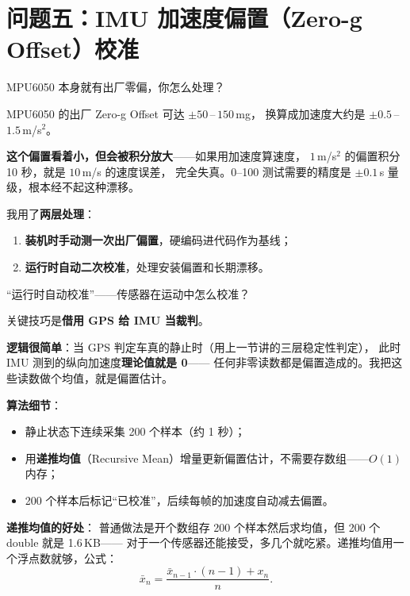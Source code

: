 \documentclass[UTF8,11pt,a4paper]{ctexart}
\begin{document}
\section{问题五：IMU 加速度偏置（Zero-g Offset）校准}

\begin{interviewer}
MPU6050 本身就有出厂零偏，你怎么处理？
\end{interviewer}

\begin{candidate}
MPU6050 的出厂 Zero-g Offset 可达 $\pm 50$\,–\,$150$\,mg，
换算成加速度大约是 $\pm 0.5$\,–\,$1.5$\,m/s$^2$。

\medskip
\textbf{这个偏置看着小，但会被积分放大}——如果用加速度算速度，
$1$\,m/s$^2$ 的偏置积分 10 秒，就是 $10$\,m/s 的速度误差，
完全失真。0--100 测试需要的精度是 $\pm 0.1$\,s 量级，根本经不起这种漂移。

\medskip
我用了\textbf{两层处理}：
\begin{enumerate}[leftmargin=1.4em,topsep=2pt,itemsep=2pt]
  \item \textbf{装机时手动测一次出厂偏置}，硬编码进代码作为基线；
  \item \textbf{运行时自动二次校准}，处理安装偏置和长期漂移。
\end{enumerate}
\end{candidate}

\begin{interviewer}
``运行时自动校准''——传感器在运动中怎么校准？
\end{interviewer}

\begin{candidate}
关键技巧是\textbf{借用 GPS 给 IMU 当裁判}。

\medskip
\textbf{逻辑很简单}：当 GPS 判定车真的静止时（用上一节讲的三层稳定性判定），
此时 IMU 测到的纵向加速度\textbf{理论值就是 0}——
任何非零读数都是偏置造成的。我把这些读数做个均值，就是偏置估计。

\medskip
\textbf{算法细节}：
\begin{itemize}[leftmargin=1.4em,topsep=2pt,itemsep=2pt]
  \item 静止状态下连续采集 200 个样本（约 1 秒）；
  \item 用\textbf{递推均值}（Recursive Mean）增量更新偏置估计，不需要存数组——$O(1)$ 内存；
  \item 200 个样本后标记``已校准''，后续每帧的加速度自动减去偏置。
\end{itemize}

\medskip
\textbf{递推均值的好处}：
普通做法是开个数组存 200 个样本然后求均值，但 200 个 double 就是 1.6\,KB——
对于一个传感器还能接受，多几个就吃紧。递推均值用一个浮点数就够，公式：
\[
\bar{x}_n = \frac{\bar{x}_{n-1}\cdot(n-1) + x_n}{n}.
\]
\end{candidate}
\end{document}
